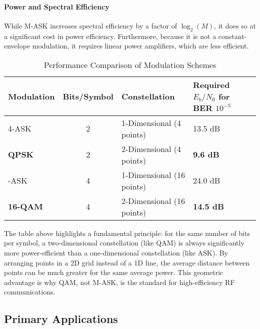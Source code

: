 \paragraph{Power and Spectral Efficiency}
While M-ASK increases spectral efficiency by a factor of $\log_2(M)$, it does so at a significant cost in power efficiency. Furthermore, because it is not a constant-envelope modulation, it requires linear power amplifiers, which are less efficient.

\begin{table}[H]
    \centering
    \caption{Performance Comparison of Modulation Schemes}
    \label{tab:ask-comparison}
    \begin{tabularx}{\textwidth}{@{}lcXX@{}}
        \toprule
        \tableheaderfont Modulation & \tableheaderfont Bits/Symbol & \tableheaderfont Constellation & \tableheaderfont Required $E_b/N_0$ for BER $10^{-5}$ \\
        \midrule
        4-ASK & 2 & 1-Dimensional (4 points) & 13.5 dB \\
        \textbf{QPSK} & 2 & 2-Dimensional (4 points) & \textbf{9.6 dB} \\
        \addlinespace
        16-ASK & 4 & 1-Dimensional (16 points) & 24.0 dB \\
        \textbf{16-QAM} & 4 & 2-Dimensional (16 points) & \textbf{14.5 dB} \\
        \bottomrule
    \end{tabularx}
\end{table}

\begin{importantbox}[title={Why QAM is Superior to M-ASK}]
    The table above highlights a fundamental principle: for the same number of bits per symbol, a two-dimensional constellation (like QAM) is always significantly more power-efficient than a one-dimensional constellation (like ASK). By arranging points in a 2D grid instead of a 1D line, the average distance between points can be much greater for the same average power. This geometric advantage is why QAM, not M-ASK, is the standard for high-efficiency RF communications.
\end{importantbox}


\subsection{Primary Applications}

